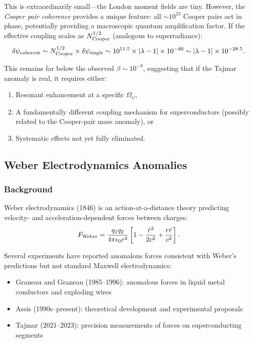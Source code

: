 \documentclass[aps,prd,twocolumn,superscriptaddress,floatfix,nofootinbib]{revtex4-2}
\newcommand{\Opsi}{\Omega_\psi}
\newcommand{\lam}{\lambda}
\begin{document}
This is extraordinarily small---the London moment fields are tiny.
However, the \emph{Cooper pair coherence} provides a unique feature:
all $\sim 10^{23}$ Cooper pairs act in phase, potentially providing a
macroscopic quantum amplification factor. If the effective coupling
scales as $N_{\rm Cooper}^{1/2}$ (analogous to superradiance):
\begin{equation}
\delta\psi_{\rm coherent} \sim N_{\rm Cooper}^{1/2} \times \delta\psi_{\rm single}
\sim 10^{11.5} \times |\lam-1| \times 10^{-40}
\sim |\lam-1| \times 10^{-28.5}.
\end{equation}

This remains far below the observed $\beta \sim 10^{-8}$, suggesting
that if the Tajmar anomaly is real, it requires either:
\begin{enumerate}[nosep]
\item Resonant enhancement at a specific $\Opsi$,
\item A fundamentally different coupling mechanism for superconductors
(possibly related to the Cooper-pair mass anomaly), or
\item Systematic effects not yet fully eliminated.
\end{enumerate}

\subsection{Weber Electrodynamics Anomalies}\label{sec:weber}

\subsubsection{Background}

Weber electrodynamics (1846) is an action-at-a-distance theory
predicting velocity- and acceleration-dependent forces between
charges:
\begin{equation}
F_{\rm Weber} = \frac{q_1 q_2}{4\pi\epsilon_0 r^2}
\left[1 - \frac{\dot{r}^2}{2c^2} + \frac{r\ddot{r}}{c^2}\right].
\end{equation}

Several experiments have reported anomalous forces consistent with
Weber's predictions but not standard Maxwell electrodynamics:
\begin{itemize}[nosep]
\item Graneau and Graneau (1985--1996): anomalous forces in liquid
metal conductors and exploding wires
\item Assis (1990s--present): theoretical development and experimental
proposals
\item Tajmar (2021--2023): precision measurements of forces on
superconducting segments
\end{itemize}
\end{document}
